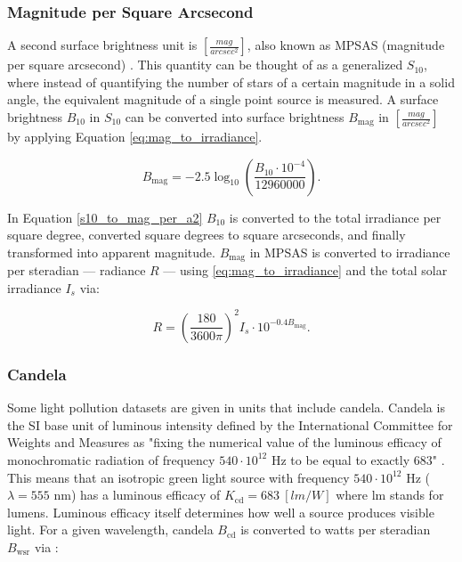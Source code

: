 \subsubsection{Magnitude per Square Arcsecond}

A second surface brightness unit is $\left[ \frac{mag}{arcsec^2} \right]$, also known as MPSAS (magnitude per square arcsecond) \cite{krag2003}. This quantity can be thought of as a generalized $S_{10}$, where instead of quantifying the number of stars of a certain
magnitude in a solid angle, the equivalent magnitude of a single point source is measured. A surface
brightness $B_{10}$ in $S_{10}$ can be converted into surface brightness $B_\mathrm{mag}$ in 
$\left[ \frac{mag}{arcsec^2} \right]$ by applying Equation \ref{eq:mag_to_irradiance}.

\begin{equation} \label{s10_to_mag_per_a2}
	B_\mathrm{mag} = -2.5 \log_{10}\left( \frac{B_{10} \cdot 10^{-4}}{12960000} \right).
\end{equation}

In Equation \ref{s10_to_mag_per_a2} $B_{10}$ is converted to the total irradiance per square degree,
converted square degrees to square arcseconds, and finally transformed into apparent magnitude. $B_\mathrm{mag}$ in MPSAS is converted to irradiance per steradian --- radiance $R$ --- using \ref{eq:mag_to_irradiance} and the total solar irradiance $I_s$ via:

\begin{equation} \label{eq:mpsas_to_irrad_per_ster}
  R = \left( \frac{180}{ 3600\pi} \right)^2 I_s \cdot 10^{-0.4 B_\mathrm{mag}}.
\end{equation}

\subsubsection{Candela} \label{sec:candela}

Some light pollution datasets are given in units that include candela. Candela is the SI base unit of luminous intensity defined by the International Committee for Weights and Measures as "fixing the numerical value of the luminous efficacy of monochromatic radiation of frequency $540\cdot10^{12}$ Hz to be equal to exactly $683$" \cite{nist_units}. This means that an isotropic green light source with frequency $540\cdot10^{12}$ Hz ($\lambda = 555$ nm) has a luminous efficacy of $K_\mathrm{cd} = 683 \: \left[ lm/W \right]$ where lm stands for lumens. Luminous efficacy itself determines how well a source produces visible light. For a given wavelength, candela $B_\mathrm{cd}$ is converted to watts per steradian $B_\mathrm{wsr}$ via \cite{nist_units}:

